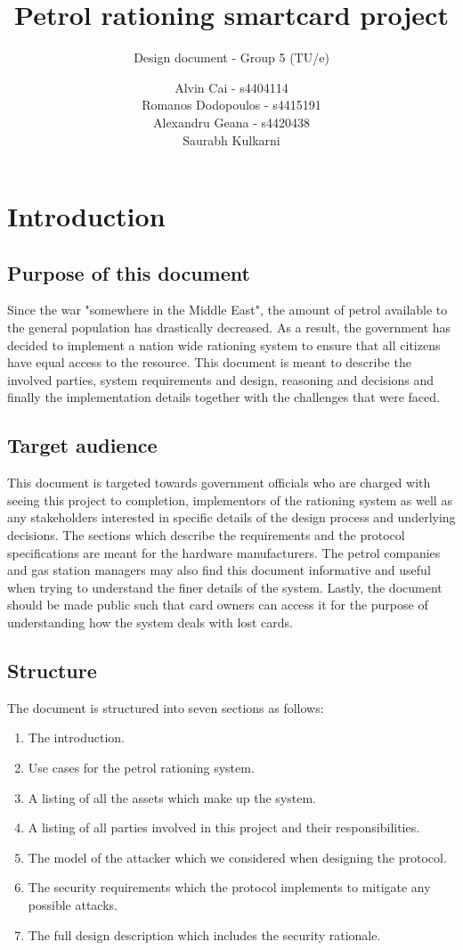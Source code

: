 \documentclass[a4paper,10pt]{llncs}
\title{Petrol rationing smartcard project}
\subtitle{Design document - Group 5 (TU/e)}
\author{Alvin Cai - s4404114 \\ Romanos Dodopoulos - s4415191 \\ Alexandru Geana - s4420438 \\ Saurabh Kulkarni}
\institute{}
\begin{document}
\maketitle

\section{Introduction}
\subsection{Purpose of this document}

Since the war "somewhere in the Middle East", the amount of petrol available to the general population has drastically decreased. As a result, the government has decided to implement a nation wide rationing system to ensure that all citizens have equal access to the resource. This document is meant to describe the involved parties, system requirements and design, reasoning and decisions and finally the implementation details together with the challenges that were faced.

\subsection{Target audience}

This document is targeted towards government officials who are charged with seeing this project to completion, implementors of the rationing system as well as any stakeholders interested in specific details of the design process and underlying decisions. The sections which describe the requirements and the protocol specifications are meant for the hardware manufacturers. The petrol companies and gas station managers may also find this document informative and useful when trying to understand the finer details of the system. Lastly, the document should be made public such that card owners can access it for the purpose of understanding how the system deals with lost cards.

\subsection{Structure}

The document is structured into seven sections as follows:
\begin{enumerate}
  \item The introduction.
  \item Use cases for the petrol rationing system.
  \item A listing of all the assets which make up the system.
  \item A listing of all parties involved in this project and their responsibilities.
  \item The model of the attacker which we considered when designing the protocol.
  \item The security requirements which the protocol implements to mitigate any possible attacks.
  \item The full design description which includes the security rationale.
\end{enumerate}
\end{document}
